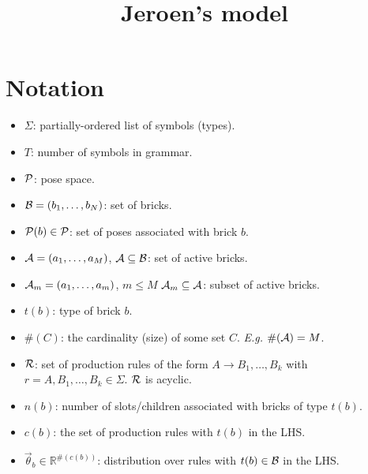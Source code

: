 \documentclass[11pt]{article}
\newcommand{\Pose}{{\cal P}}
\newcommand{\A}{{\cal A}}
\newcommand{\symb}{\Sigma}
\newcommand{\B}{\cal B}
\newcommand{\Am}{\A_{m}}
\begin{document}
\title{Jeroen's model}
\maketitle

\section{Notation}

\begin{itemize}

\item $\symb$: partially-ordered list of symbols (types).


\item $T$: number of symbols in grammar.

\item $\Pose$: pose space.

\item ${\B} = (b_1,\ldots,b_N)$: set of bricks.

\item $\Pose(b) \in \Pose$: set of poses associated with brick $b$.

\item $\A = (a_1,\ldots,a_M)$, $\A \subseteq {\B}$: set of active bricks.

\item $\Am = (a_1,\ldots,a_m)$, $m \leq M$ $\Am \subseteq {\A}$: subset of active bricks.

\item $t(b)$: type of brick $b$.

\item $\#(C)$: the cardinality (size) of some set $C$. \emph{E.g.} $\#(\A)=M$.

\item ${\cal R}$: set of production rules of the form
$A \rightarrow B_1,\ldots,B_k$ with $r = A,B_1,\ldots,B_k \in \Sigma$. ${\cal R}$ is acyclic.

\item $n(b)$: number of slots/children associated with bricks of type $t(b)$.

\item $c(b)$: the set of production rules with $t(b)$ in the LHS.

\item $\vec{\theta}_b \in \mathbb{R}^{\#(c(b))}$: distribution over rules with  $t(b) \in \B$ in the LHS.


\end{itemize}
\end{document}
